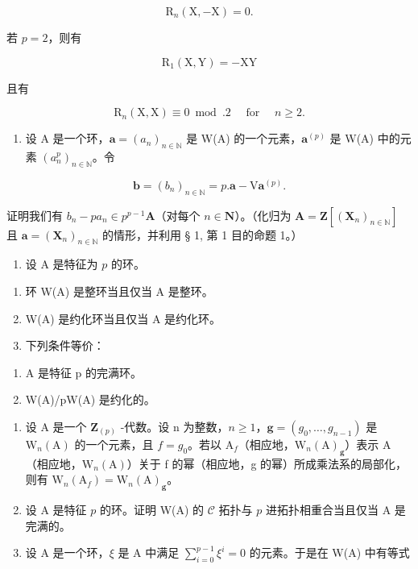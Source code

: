 \[
\mathrm{R} _ {n} (\mathrm{X}, - \mathrm{X}) = 0.
\]

若 \(p = 2\)，则有

\[
\mathrm{R} _ {1} (\mathrm{X}, \mathrm{Y}) = - \mathrm{XY}
\]

且有

\[
\mathrm{R} _ {n} (\mathrm{X}, \mathrm{X}) \equiv 0 \bmod . 2 \quad \text { for } \quad n \geqslant 2.
\]

\begin{enumerate}
\def\labelenumi{\arabic{enumi})}
\setcounter{enumi}{3}
\tightlist
\item
  设 A 是一个环，\(\boldsymbol{a} = (a_n)_{n \in \mathbb{N}}\) 是 W(A) 的一个元素，\(\boldsymbol{a}^{(p)}\) 是 W(A) 中的元素 \((a_n^p)_{n \in \mathbb{N}}\)。令
\end{enumerate}

\[
\boldsymbol {b} = (b _ {n}) _ {n \in \mathbb {N}} = p. \boldsymbol {a} - \mathrm{V} \boldsymbol {a} ^ {(p)}.
\]

证明我们有 \(b_n - pa_n \in p^{p-1} \mathbf{A}\)（对每个 \(n \in \mathbf{N}\)）。（化归为 \(\mathbf{A} = \mathbf{Z}[(\mathbf{X}_n)_{n \in \mathbb{N}}]\) 且 \(\boldsymbol{a} = (\mathbf{X}_n)_{n \in \mathbb{N}}\) 的情形，并利用 § 1, 第 1 目的命题 1。）

\begin{enumerate}
\def\labelenumi{\arabic{enumi})}
\setcounter{enumi}{4}
\tightlist
\item
  设 A 是特征为 \(p\) 的环。
\end{enumerate}

\begin{enumerate}
\def\labelenumi{\alph{enumi})}
\item
  环 W(A) 是整环当且仅当 A 是整环。
\item
  W(A) 是约化环当且仅当 A 是约化环。
\item
  下列条件等价：
\end{enumerate}

\begin{enumerate}
\def\labelenumi{(\roman{enumi})}
\item
  A 是特征 p 的完满环。
\item
  W(A)/pW(A) 是约化的。
\end{enumerate}

\begin{enumerate}
\def\labelenumi{\arabic{enumi})}
\setcounter{enumi}{5}
\item
  设 A 是一个 \(\mathbf{Z}_{(p)}\) -代数。设 n 为整数，\(n \geqslant 1\)，\(\boldsymbol{g} = (g_{0}, \ldots, g_{n-1})\) 是 \(\mathrm{W}_{n}(\mathrm{A})\) 的一个元素，且 \(f = g_{0}\)。若以 \(\mathrm{A}_{f}\)（相应地，\(\mathrm{W}_{n}(\mathrm{A})_{\boldsymbol{g}}\)）表示 A（相应地，\(\mathrm{W}_{n}(\mathrm{A})\)）关于 f 的幂（相应地，g 的幂）所成乘法系的局部化，则有 \(\mathrm{W}_{n}(\mathrm{A}_{f}) = \mathrm{W}_{n}(\mathrm{A})_{\boldsymbol{g}}\)。
\item
  设 A 是特征 \(p\) 的环。证明 W(A) 的 \(\mathcal{C}\) 拓扑与 \(p\) 进拓扑相重合当且仅当 A 是完满的。
\item
  设 A 是一个环，\(\xi\) 是 A 中满足 \(\sum_{i=0}^{p-1} \xi^i = 0\) 的元素。于是在 W(A) 中有等式
\end{enumerate}

